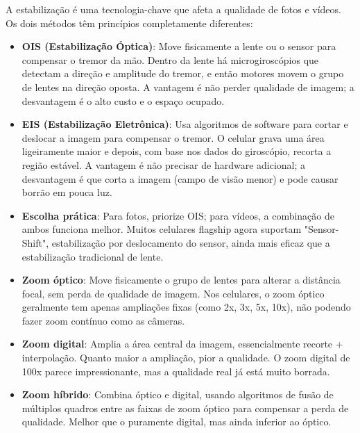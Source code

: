 A estabilização é uma tecnologia-chave que afeta a qualidade de fotos e vídeos. Os dois métodos têm princípios completamente diferentes:

\begin{itemize}
  \item \textbf{OIS (Estabilização Óptica)}: Move fisicamente a lente ou o sensor para compensar o tremor da mão. Dentro da lente há microgiroscópios que detectam a direção e amplitude do tremor, e então motores movem o grupo de lentes na direção oposta. A vantagem é não perder qualidade de imagem; a desvantagem é o alto custo e o espaço ocupado.
  \item \textbf{EIS (Estabilização Eletrônica)}: Usa algoritmos de software para cortar e deslocar a imagem para compensar o tremor. O celular grava uma área ligeiramente maior e depois, com base nos dados do giroscópio, recorta a região estável. A vantagem é não precisar de hardware adicional; a desvantagem é que corta a imagem (campo de visão menor) e pode causar borrão em pouca luz.
  \item \textbf{Escolha prática}: Para fotos, priorize OIS; para vídeos, a combinação de ambos funciona melhor. Muitos celulares flagship agora suportam "Sensor-Shift", estabilização por deslocamento do sensor, ainda mais eficaz que a estabilização tradicional de lente.
\end{itemize}


\begin{itemize}
  \item \textbf{Zoom óptico}: Move fisicamente o grupo de lentes para alterar a distância focal, sem perda de qualidade de imagem. Nos celulares, o zoom óptico geralmente tem apenas ampliações fixas (como 2x, 3x, 5x, 10x), não podendo fazer zoom contínuo como as câmeras.
  \item \textbf{Zoom digital}: Amplia a área central da imagem, essencialmente recorte + interpolação. Quanto maior a ampliação, pior a qualidade. O zoom digital de 100x parece impressionante, mas a qualidade real já está muito borrada.
  \item \textbf{Zoom híbrido}: Combina óptico e digital, usando algoritmos de fusão de múltiplos quadros entre as faixas de zoom óptico para compensar a perda de qualidade. Melhor que o puramente digital, mas ainda inferior ao óptico.
\end{itemize}


